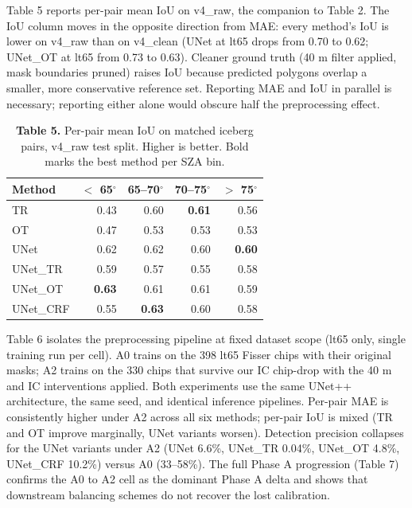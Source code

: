 \documentclass[review,jog]{igs}
\begin{document}
Table 5 reports per-pair mean IoU on v4\_raw, the companion to Table 2. The IoU column moves in the opposite direction from MAE: every method's IoU is lower on v4\_raw than on v4\_clean (UNet at lt65 drops from 0.70 to 0.62; UNet\_OT at lt65 from 0.73 to 0.63). Cleaner ground truth (40 m filter applied, mask boundaries pruned) raises IoU because predicted polygons overlap a smaller, more conservative reference set. Reporting MAE and IoU in parallel is necessary; reporting either alone would obscure half the preprocessing effect.

\begin{table}[h]
\caption{\textbf{Table 5.} Per-pair mean IoU on matched iceberg pairs, v4\_raw test split. Higher is better. Bold marks the best method per SZA bin.}
\centering
\begin{tabular}{lrrrr}
\toprule
Method & $<$ 65$^\circ$ & 65--70$^\circ$ & 70--75$^\circ$ & $>$ 75$^\circ$ \\
\midrule
TR        & 0.43           & 0.60           & \textbf{0.61}  & 0.56 \\
OT        & 0.47           & 0.53           & 0.53           & 0.53 \\
UNet      & 0.62           & 0.62           & 0.60           & \textbf{0.60} \\
UNet\_TR  & 0.59           & 0.57           & 0.55           & 0.58 \\
UNet\_OT  & \textbf{0.63}  & 0.61           & 0.61           & 0.59 \\
UNet\_CRF & 0.55           & \textbf{0.63}  & 0.60           & 0.58 \\
\bottomrule
\end{tabular}
\end{table}

Table 6 isolates the preprocessing pipeline at fixed dataset scope (lt65 only, single training run per cell). A0 trains on the 398 lt65 Fisser chips with their original masks; A2 trains on the 330 chips that survive our IC chip-drop with the 40 m and IC interventions applied. Both experiments use the same UNet++ architecture, the same seed, and identical inference pipelines. Per-pair MAE is consistently higher under A2 across all six methods; per-pair IoU is mixed (TR and OT improve marginally, UNet variants worsen). Detection precision collapses for the UNet variants under A2 (UNet 6.6\%, UNet\_TR 0.04\%, UNet\_OT 4.8\%, UNet\_CRF 10.2\%) versus A0 (33--58\%). The full Phase A progression (Table 7) confirms the A0 to A2 cell as the dominant Phase A delta and shows that downstream balancing schemes do not recover the lost calibration.
\end{document}
